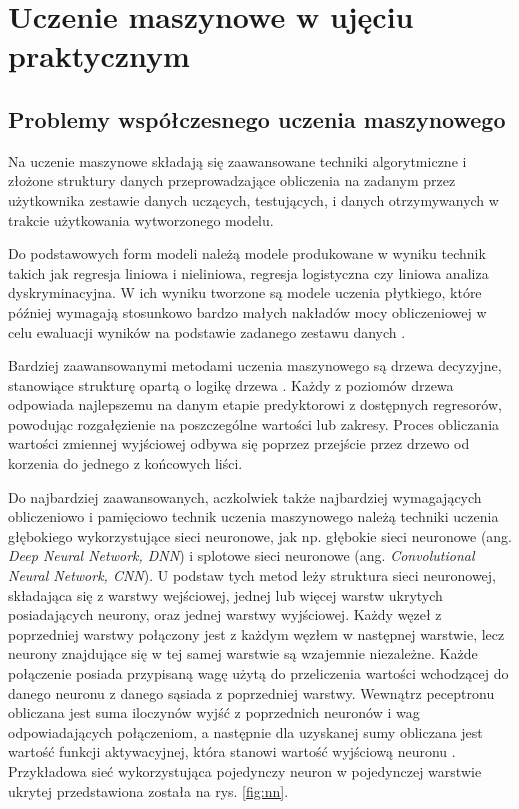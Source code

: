 \chapter{Uczenie maszynowe w ujęciu praktycznym}
\section{Problemy współczesnego uczenia maszynowego}

Na uczenie maszynowe składają się zaawansowane techniki algorytmiczne i złożone struktury danych przeprowadzające obliczenia na zadanym przez użytkownika zestawie danych uczących, testujących, i danych otrzymywanych w trakcie użytkowania wytworzonego modelu. 

Do podstawowych form modeli należą modele produkowane w wyniku technik takich jak regresja liniowa i nieliniowa, regresja logistyczna czy liniowa analiza dyskryminacyjna. W ich wyniku tworzone są modele uczenia płytkiego, które później wymagają stosunkowo bardzo małych nakładów mocy obliczeniowej w celu ewaluacji wyników na podstawie zadanego zestawu danych \cite{shallow}.

Bardziej zaawansowanymi metodami uczenia maszynowego są drzewa decyzyjne, stanowiące strukturę opartą o logikę drzewa \cite{tree}. Każdy z poziomów drzewa odpowiada najlepszemu na danym etapie predyktorowi z dostępnych regresorów, powodując rozgałęzienie na poszczególne wartości lub zakresy. Proces obliczania wartości zmiennej wyjściowej odbywa się poprzez przejście przez drzewo od korzenia do jednego z końcowych liści.

Do najbardziej zaawansowanych, aczkolwiek także najbardziej wymagających obliczeniowo i pamięciowo technik uczenia maszynowego należą techniki uczenia głębokiego wykorzystujące sieci neuronowe, jak np. głębokie sieci neuronowe (ang. \textit{Deep Neural Network, DNN}) i splotowe sieci neuronowe (ang. \textit{Convolutional Neural Network, CNN}). U podstaw tych metod leży struktura sieci neuronowej, składająca się z warstwy wejściowej, jednej lub więcej warstw ukrytych posiadających neurony, oraz jednej warstwy wyjściowej. Każdy węzeł z poprzedniej warstwy połączony jest z każdym węzłem w następnej warstwie, lecz neurony znajdujące się w tej samej warstwie są wzajemnie niezależne. Każde połączenie posiada przypisaną wagę użytą do przeliczenia wartości wchodzącej do danego neuronu z danego sąsiada z poprzedniej warstwy. Wewnątrz peceptronu obliczana jest suma iloczynów wyjść z poprzednich neuronów i wag odpowiadających połączeniom, a następnie dla uzyskanej sumy obliczana jest wartość funkcji aktywacyjnej, która stanowi wartość wyjściową neuronu \cite{mit_neural}. Przykładowa sieć wykorzystująca pojedynczy neuron w pojedynczej warstwie ukrytej przedstawiona została na rys. \ref{fig:nn}. 

